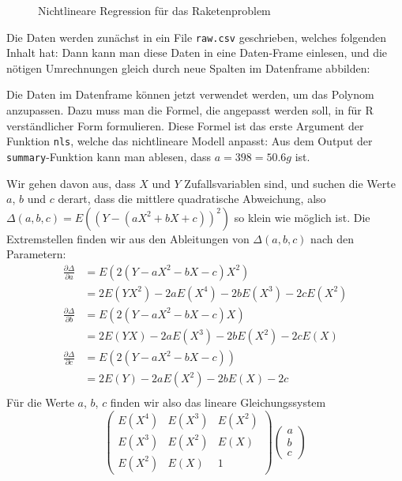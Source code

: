 \begin{figure}
\begin{center}
\end{center}
\caption{Nichtlineare Regression für das Raketenproblem}
\end{figure}
\begin{loesung}
\begin{teilaufgaben}
\item
Die Daten werden zunächst in ein File {\tt raw.csv}
geschrieben, welches folgenden Inhalt hat:
Dann kann man diese Daten in eine Daten-Frame einlesen,
und die nötigen Umrechnungen gleich durch neue Spalten im
Datenframe abbilden:
\item
Die Daten im Datenframe können jetzt verwendet werden, um
das Polynom anzupassen. Dazu muss man die Formel, die angepasst
werden soll, in für R verständlicher Form formulieren.
Diese Formel ist das erste Argument der Funktion {\tt nls}, welche
das nichtlineare Modell anpasst:
Aus dem Output der {\tt summary}-Funktion
kann man ablesen, dass $a=398=50.6g$ ist.
\item Wir gehen davon aus, dass $X$ und $Y$ Zufallsvariablen sind, und
suchen die Werte $a$, $b$ und $c$ derart, dass die mittlere quadratische
Abweichung, also
$\Delta(a,b,c)=E((Y-(aX^2+bX+c))^2)$ so klein wie möglich ist.
Die Extremstellen finden wir aus den Ableitungen von $\Delta(a,b,c)$ nach
den Parametern:
\begin{align*}
\frac{\partial \Delta}{\partial a}
&=
E(2(Y-aX^2-bX-c)X^2)
\\
&=
2E(YX^2)-2aE(X^4)-2bE(X^3)-2cE(X^2)
\\
\frac{\partial \Delta}{\partial b}
&=
E(2(Y-aX^2-bX-c)X)
\\
&=
2E(YX)-2aE(X^3)-2bE(X^2)-2cE(X)
\\
\frac{\partial \Delta}{\partial c}
&=E(2(Y-aX^2-bX-c))
\\
&=
2E(Y)-2aE(X^2)-2bE(X)-2c
\\
\end{align*}
Für die Werte $a$, $b$, $c$ finden wir also das lineare Gleichungssystem
\[
\begin{pmatrix}
E(X^4)&E(X^3)&E(X^2)\\
E(X^3)&E(X^2)&E(X)\\
E(X^2)&E(X)&1
\end{pmatrix}
\begin{pmatrix}
a\\b\\c

\end{pmatrix}\]
\end{teilaufgaben}
\end{loesung}
